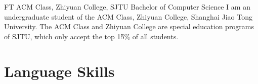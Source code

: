 \documentclass[10pt]{article} %
\begin{document}
\begin{paracol}{2}
{FT}
{ACM Class, Zhiyuan College, SJTU}
{Bachelor of Computer Science}
{I am an undergraduate student of the ACM Class, Zhiyuan College, Shanghai Jiao Tong University. The ACM Class and Zhiyuan College are special education programs of SJTU, which only accept the top 1\~5\% of all students.}



\vspace{-\baselineskip}\medskip %


\medskip %













\section{Language Skills}


\end{paracol}
\end{document}
